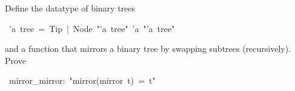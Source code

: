 \begin{isabelle}%
%
\begin{isamarkuptext}%
\noindent
Define the datatype of binary trees%
\end{isamarkuptext}%
~'a~tree~=~Tip~|~Node~{"}'a~tree{"}~'a~{"}'a~tree{"}%
\begin{isamarkuptext}%
\noindent
and a function  that mirrors a binary tree
by swapping subtrees (recursively). Prove%
\end{isamarkuptext}%
~mirror\_mirror:~{"}mirror(mirror~t)~=~t{"}\end{isabelle}%

